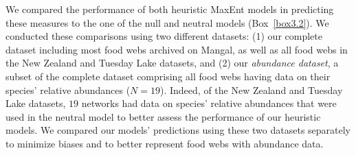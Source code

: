 We compared the performance of both heuristic MaxEnt models in predicting these
measures to the one of the null and neutral models (Box~\ref{box3.2}). We
conducted these comparisons using two different datasets: (1) our complete
dataset including most food webs archived on Mangal, as well as all food webs in
the New Zealand and Tuesday Lake datasets, and (2) our \textit{abundance
dataset}, a subset of the complete dataset comprising all food webs having data
on their species' relative abundances ($N=19$). Indeed, of the New Zealand and
Tuesday Lake datasets, $19$ networks had data on species' relative abundances
that were used in the neutral model to better assess the performance of our
heuristic models. We compared our models' predictions using these two datasets
separately to minimize biases and to better represent food webs with abundance
data.



